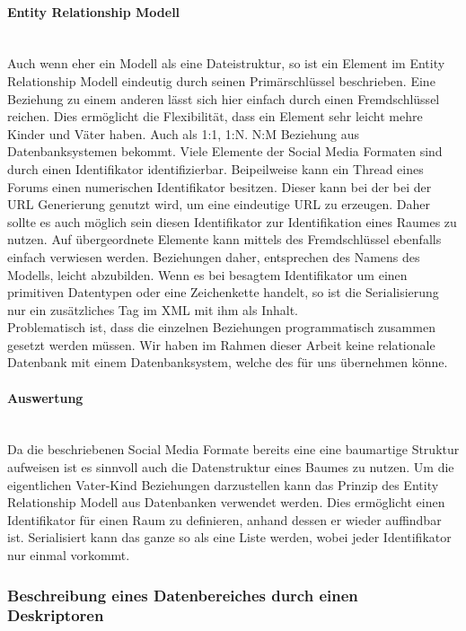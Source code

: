 \documentclass[a4paper]{article}
\begin{document}
	\paragraph{Entity Relationship Modell}\mbox{} \\
	
	Auch wenn eher ein Modell als eine Dateistruktur, so ist ein Element im
	Entity Relationship Modell eindeutig durch seinen Primärschlüssel beschrieben.
	Eine Beziehung zu einem anderen lässt sich hier einfach durch einen
	Fremdschlüssel reichen. Dies ermöglicht die Flexibilität, dass ein Element
	sehr leicht mehre Kinder und Väter haben. Auch als 1:1, 1:N. N:M Beziehung
	aus Datenbanksystemen bekommt. Viele Elemente der Social Media Formaten sind
	durch einen Identifikator identifizierbar. Beipeilweise kann ein Thread eines
	Forums einen numerischen Identifikator besitzen. Dieser kann bei der bei der
	URL Generierung	genutzt wird, um eine eindeutige URL zu erzeugen. Daher sollte
	es auch möglich sein diesen Identifikator zur Identifikation eines Raumes zu
	nutzen. Auf übergeordnete Elemente kann mittels des Fremdschlüssel ebenfalls
	einfach verwiesen werden. Beziehungen daher, entsprechen des Namens des
	Modells, leicht abzubilden.	Wenn es bei besagtem Identifikator um einen
	primitiven Datentypen oder eine Zeichenkette handelt, so ist die
	Serialisierung nur ein zusätzliches Tag im XML mit ihm als Inhalt. \\
	
	Problematisch ist, dass die einzelnen Beziehungen programmatisch zusammen
	gesetzt werden müssen. Wir haben im Rahmen dieser Arbeit keine relationale
	Datenbank mit einem Datenbanksystem, welche des für uns übernehmen könne.
	
	\paragraph{Auswertung}\mbox{} \\
	
	Da die beschriebenen Social Media Formate bereits eine eine baumartige Struktur
	aufweisen ist es sinnvoll auch die Datenstruktur eines Baumes zu nutzen. Um
	die eigentlichen Vater-Kind Beziehungen darzustellen kann das Prinzip des
	Entity Relationship Modell aus Datenbanken verwendet werden. Dies ermöglicht
	einen Identifikator für einen Raum zu definieren, anhand dessen er wieder
	auffindbar ist. Serialisiert kann das ganze so als eine Liste werden, wobei
	jeder Identifikator nur einmal vorkommt.
	
	\subsubsection{Beschreibung eines Datenbereiches durch einen Deskriptoren}
	
\end{document}
